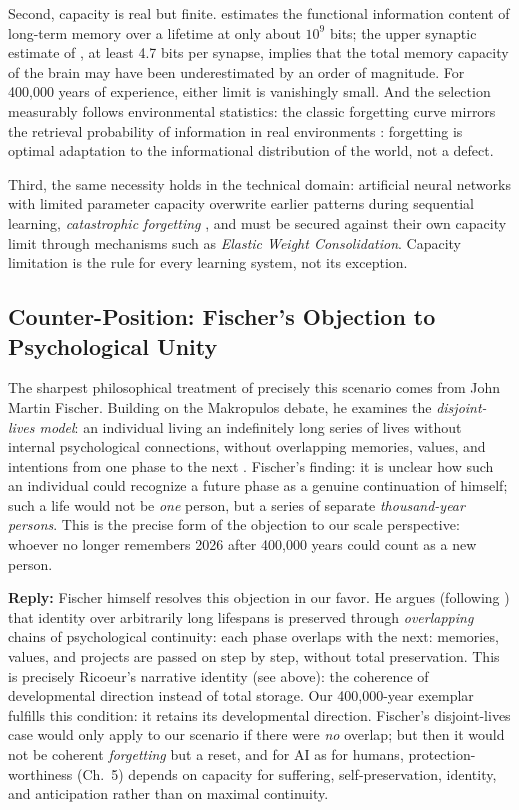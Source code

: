 \documentclass[acmlarge, nonacm]{acmart}
\begin{document}
Second, capacity is real but finite. \citet{landauer1986} estimates the functional information content of long-term memory over a lifetime at only about $10^9$ bits; the upper synaptic estimate of \citet{bartol2015}, at least 4.7 bits per synapse, implies that the total memory capacity of the brain may have been underestimated by an order of magnitude. For 400,000 years of experience, either limit is vanishingly small. And the selection measurably follows environmental statistics: the classic forgetting curve \cite{ebbinghaus1885, murre_dros2015} mirrors the retrieval probability of information in real environments \cite{anderson_schooler1991}: forgetting is optimal adaptation to the informational distribution of the world, not a defect.

Third, the same necessity holds in the technical domain: artificial neural networks with limited parameter capacity overwrite earlier patterns during sequential learning, \textit{catastrophic forgetting} \cite{kirkpatrick2017}, and must be secured against their own capacity limit through mechanisms such as \textit{Elastic Weight Consolidation}. Capacity limitation is the rule for every learning system, not its exception.

\subsection{Counter-Position: Fischer's Objection to Psychological Unity}

The sharpest philosophical treatment of precisely this scenario comes from John Martin Fischer. Building on the Makropulos debate, he examines the \textit{disjoint-lives model}: an individual living an indefinitely long series of lives without internal psychological connections, without overlapping memories, values, and intentions from one phase to the next \cite{fischer2020}. Fischer's finding: it is unclear how such an individual could recognize a future phase as a genuine continuation of himself; such a life would not be \textit{one} person, but a series of separate \textit{thousand-year persons}. This is the precise form of the objection to our scale perspective: whoever no longer remembers 2026 after 400,000 years could count as a new person.

\textbf{Reply:} Fischer himself resolves this objection in our favor. He argues (following \citeauthor{parfit1984}\cite{parfit1984}) that identity over arbitrarily long lifespans is preserved through \textit{overlapping} chains of psychological continuity: each phase overlaps with the next: memories, values, and projects are passed on step by step, without total preservation. This is precisely Ricoeur's narrative identity (see above): the coherence of developmental direction instead of total storage. Our 400,000-year exemplar fulfills this condition: it retains its developmental direction. Fischer's disjoint-lives case would only apply to our scenario if there were \textit{no} overlap; but then it would not be coherent \textit{forgetting} but a reset, and for AI as for humans, protection-worthiness (Ch.~5) depends on capacity for suffering, self-preservation, identity, and anticipation rather than on maximal continuity.
\end{document}
